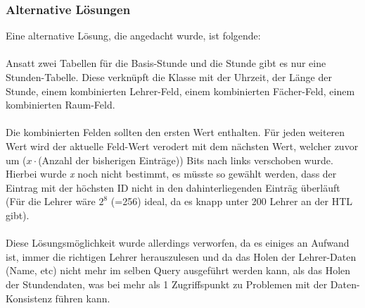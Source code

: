 \subsubsection{Alternative Lösungen}

Eine alternative Lösung, die angedacht wurde, ist folgende:\\
\\
Ansatt zwei Tabellen für die Basis-Stunde und die Stunde gibt es nur eine Stunden-Tabelle.
Diese verknüpft die Klasse mit der Uhrzeit, der Länge der Stunde, einem kombinierten Lehrer-Feld, einem kombinierten Fächer-Feld, einem kombinierten Raum-Feld.\\
\\
Die kombinierten Felden sollten den ersten Wert enthalten. Für jeden weiteren Wert wird der aktuelle Feld-Wert verodert mit dem nächsten Wert, welcher zuvor um ($x \cdot $(Anzahl der bisherigen Einträge)) Bits nach links verschoben wurde.\\
Hierbei wurde \textit{x} noch nicht bestimmt, es müsste so gewählt werden, dass der Eintrag mit der höchsten ID nicht in den dahinterliegenden Einträg überläuft (Für die Lehrer wäre $2^{8}$ (=256) ideal, da es knapp unter 200 Lehrer an der HTL gibt).\\
\\
Diese Lösungsmöglichkeit wurde allerdings verworfen, da es einiges an Aufwand ist, immer die richtigen Lehrer herauszulesen und da das Holen der Lehrer-Daten (Name, etc) nicht mehr im selben Query ausgeführt werden kann, als das Holen der Stundendaten, was bei mehr als 1 Zugriffspunkt zu Problemen mit der Daten-Konsistenz führen kann.
